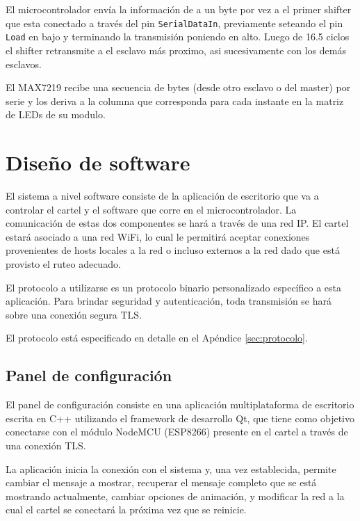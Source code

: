 El microcontrolador envía la información de a un byte por vez a el primer shifter que esta conectado a través del pin \texttt{SerialDataIn}, previamente seteando el pin \texttt{Load} en bajo y terminando la transmisión poniendo en alto. Luego de 16.5 ciclos el shifter retransmite a el esclavo más proximo, asi sucesivamente con los demás esclavos.

El MAX7219 recibe una secuencia de bytes (desde otro esclavo o del master) por serie y los deriva a la columna que corresponda para cada instante en la matriz de LEDs de su modulo.

\section{Diseño de software}
El sistema a nivel software consiste de la aplicación de escritorio que va a controlar el cartel y el software que corre en el microcontrolador.
La comunicación de estas dos componentes se hará a través de una red IP. El cartel estará asociado a una red WiFi, lo cual le permitirá aceptar conexiones provenientes de hosts locales a la red o incluso externos a la red dado que está provisto el ruteo adecuado. 

El protocolo a utilizarse es un protocolo binario personalizado específico a esta aplicación. Para brindar seguridad y autenticación, toda transmisión se hará sobre una conexión segura TLS. 

El protocolo está especificado en detalle en el Apéndice \ref{sec:protocolo}.

\subsection{Panel de configuración}
El panel de configuración consiste en una aplicación multiplataforma de escritorio escrita en C++ utilizando el framework de desarrollo Qt, que tiene como objetivo conectarse con el módulo NodeMCU (ESP8266) presente en el cartel a través de una conexión TLS.

La aplicación inicia la conexión con el sistema y, una vez establecida, permite cambiar el mensaje a mostrar, recuperar el mensaje completo que se está mostrando actualmente, cambiar opciones de animación, y modificar la red a la cual el cartel se conectará la próxima vez que se reinicie.

